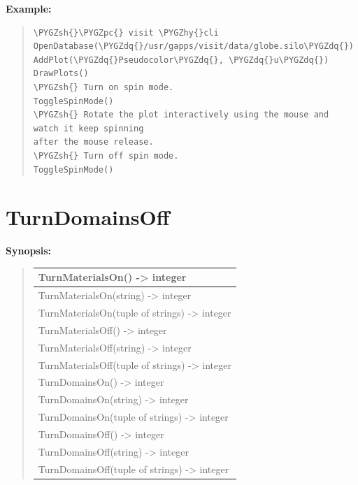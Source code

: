 \documentclass[letterpaper,10pt,english]{sphinxmanual}
\def\PYGZsh{\char`\#}
\def\PYGZpc{\char`\%}
\def\PYGZhy{\char`\-}
\def\PYGZdq{\char`\"}
\begin{document}
\begin{DUlineblock}{0em}
\item[] \textbf{Example:}
\item[] 
\end{DUlineblock}
\begin{quote}

\begin{Verbatim}[commandchars=\\\{\}]
\PYGZsh{}\PYGZpc{} visit \PYGZhy{}cli
OpenDatabase(\PYGZdq{}/usr/gapps/visit/data/globe.silo\PYGZdq{})
AddPlot(\PYGZdq{}Pseudocolor\PYGZdq{}, \PYGZdq{}u\PYGZdq{})
DrawPlots()
\PYGZsh{} Turn on spin mode.
ToggleSpinMode()
\PYGZsh{} Rotate the plot interactively using the mouse and watch it keep spinning
after the mouse release.
\PYGZsh{} Turn off spin mode.
ToggleSpinMode()
\end{Verbatim}
\end{quote}


\section{TurnDomainsOff}
\label{functions:turndomainsoff}
\begin{DUlineblock}{0em}
\item[] \textbf{Synopsis:}
\end{DUlineblock}
\begin{quote}

\begin{tabulary}{\linewidth}{|L|}
\hline

TurnMaterialsOn() -\textgreater{} integer
\\
\hline
TurnMaterialsOn(string) -\textgreater{} integer
\\
\hline
TurnMaterialsOn(tuple of strings) -\textgreater{} integer
\\
\hline
TurnMaterialsOff() -\textgreater{} integer
\\
\hline
TurnMaterialsOff(string) -\textgreater{} integer
\\
\hline
TurnMaterialsOff(tuple of strings) -\textgreater{} integer
\\
\hline
TurnDomainsOn() -\textgreater{} integer
\\
\hline
TurnDomainsOn(string) -\textgreater{} integer
\\
\hline
TurnDomainsOn(tuple of strings) -\textgreater{} integer
\\
\hline
TurnDomainsOff() -\textgreater{} integer
\\
\hline
TurnDomainsOff(string) -\textgreater{} integer
\\
\hline
TurnDomainsOff(tuple of strings) -\textgreater{} integer
\\
\hline\end{tabulary}

\end{quote}
\end{document}
